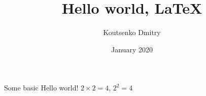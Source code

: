 \documentclass[a4paper,12pt]{article} %
\title{Hello world, LaTeX}
\author{Koutsenko Dmitry}
\date{January 2020}
\begin{document}
\maketitle
Some basic Hello world! $2\times2=4$, $2^2=4$
\end{document}
